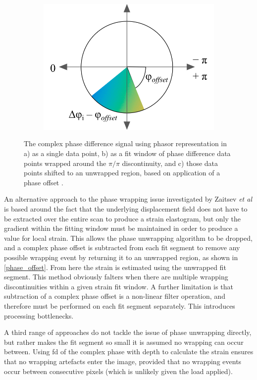 \begin{figure}[b!]
\begin{subfigure}{0.25\textwidth}
		\includegraphics[width=\textwidth]{bground_figs/cplx_segment_shifted.png}
	\end{subfigure}
	\caption{The complex phase difference signal using phasor representation in a) as a single data point, b) as a fit window of phase difference data points wrapped around the $\pi/\pi$ discontinuity, and c) those data points shifted to an unwrapped region, based on application of a phase offset \cite{zaitsev_hybrid_2016}.}
	\label{phase_offset}	
\end{figure}

An alternative approach to the phase wrapping issue investigated by Zaitsev \textit{et al} \cite{zaitsev_hybrid_2016} is based around the fact that the underlying displacement field does not have to be extracted over the entire scan to produce a strain elastogram, but only the gradient within the fitting window must be maintained in order to produce a value for local strain. This allows the phase unwrapping algorithm to be dropped, and a complex phase offset is subtracted from each fit segment to remove any possible wrapping event by returning it to an unwrapped region, as shown in \autoref{phase_offset}. From here the strain is estimated using the unwrapped fit segment. This method obviously falters when there are multiple wrapping discontinuities within a given strain fit window. A further limitation is that subtraction of a complex phase offset is a non-linear filter operation, and therefore must be performed on each fit segment separately. This introduces processing bottlenecks.

A third range of approaches do not tackle the issue of phase unwrapping directly, but rather makes the fit segment so small it is assumed no wrapping can occur between. Using \ac{fd} of the complex phase with depth to calculate the strain ensures that no wrapping artefacts enter the image, provided that no wrapping events occur between consecutive pixels (which is unlikely given the load applied). 

